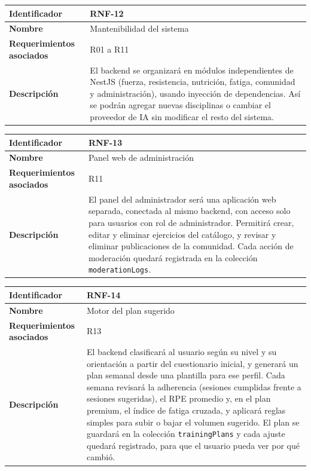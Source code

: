 \begin{table}[h!]
    \centering
    \renewcommand{\arraystretch}{1.3}
    \begin{tabular}{|p{3.5cm}|p{11.5cm}|}
        \hline
        \rowcolor[HTML]{EFEFEF}
        \textbf{Identificador} & \textbf{RNF-12} \\ \hline
        \textbf{Nombre} & Mantenibilidad del sistema \\ \hline
        \textbf{Requerimientos asociados} & R01 a R11 \\ \hline
        \textbf{Descripción} & El backend se organizará en módulos independientes de NestJS (fuerza, resistencia, nutrición, fatiga, comunidad y administración), usando inyección de dependencias. Así se podrán agregar nuevas disciplinas o cambiar el proveedor de IA sin modificar el resto del sistema. \\ \hline
    \end{tabular}
\end{table}
\begin{table}[h!]
    \centering
    \renewcommand{\arraystretch}{1.3}
    \begin{tabular}{|p{3.5cm}|p{11.5cm}|}
        \hline
        \rowcolor[HTML]{EFEFEF}
        \textbf{Identificador} & \textbf{RNF-13} \\ \hline
        \textbf{Nombre} & Panel web de administración \\ \hline
        \textbf{Requerimientos asociados} & R11 \\ \hline
        \textbf{Descripción} & El panel del administrador será una aplicación web separada, conectada al mismo backend, con acceso solo para usuarios con rol de administrador. Permitirá crear, editar y eliminar ejercicios del catálogo, y revisar y eliminar publicaciones de la comunidad. Cada acción de moderación quedará registrada en la colección \texttt{moderationLogs}. \\ \hline
    \end{tabular}
\end{table}
\newpage
\begin{table}[h!]
    \centering
    \renewcommand{\arraystretch}{1.3}
    \begin{tabular}{|p{3.5cm}|p{11.5cm}|}
        \hline
        \rowcolor[HTML]{EFEFEF}
        \textbf{Identificador} & \textbf{RNF-14} \\ \hline
        \textbf{Nombre} & Motor del plan sugerido \\ \hline
        \textbf{Requerimientos asociados} & R13 \\ \hline
        \textbf{Descripción} & El backend clasificará al usuario según su nivel y su orientación a partir del cuestionario inicial, y generará un plan semanal desde una plantilla para ese perfil. Cada semana revisará la adherencia (sesiones cumplidas frente a sesiones sugeridas), el RPE promedio y, en el plan premium, el índice de fatiga cruzada, y aplicará reglas simples para subir o bajar el volumen sugerido. El plan se guardará en la colección \texttt{trainingPlans} y cada ajuste quedará registrado, para que el usuario pueda ver por qué cambió. \\ \hline
    \end{tabular}
\end{table}

